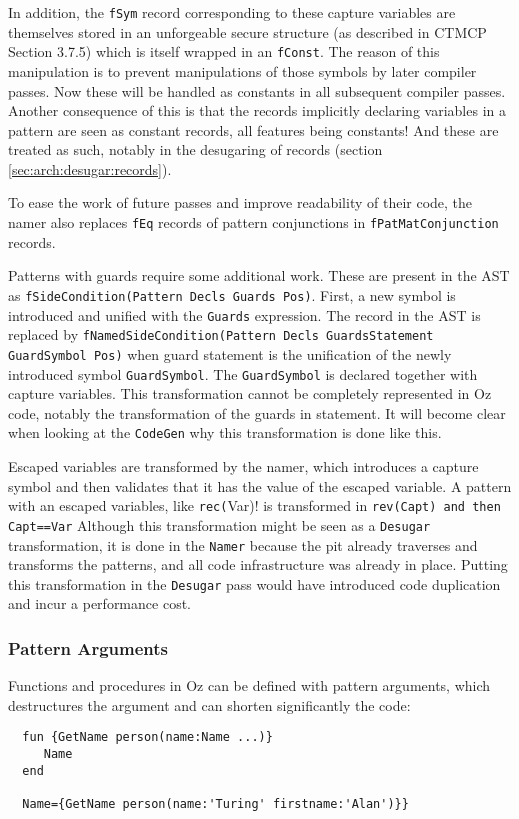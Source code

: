 \documentclass[a4paper]{memoir}
\begin{document}
In addition, the \lstinline!fSym! record corresponding to these capture
variables are themselves stored in an unforgeable secure structure (as
described in CTMCP Section 3.7.5) which is itself wrapped in an
\lstinline!fConst!. The reason of this manipulation is to prevent manipulations
of those symbols by later compiler passes. Now these will be handled as
constants in all subsequent compiler passes. Another consequence of this is
that the records implicitly declaring variables in a pattern are seen as
constant records, all features being constants! And these are treated as such,
notably in the desugaring of records (section \ref{sec:arch:desugar:records}).

To ease the work of future passes and improve readability of their code, the
namer also replaces \lstinline!fEq! records of pattern conjunctions in
\lstinline!fPatMatConjunction! records.

Patterns with guards require some additional work. These are present in the AST
as \lstinline!fSideCondition(Pattern Decls Guards Pos)!. First, a new symbol is
introduced and unified with the \lstinline!Guards! expression. The record in the
AST is replaced by \lstinline!fNamedSideCondition(Pattern Decls GuardsStatement GuardSymbol Pos)! when guard statement is the unification of the newly
introduced symbol \lstinline!GuardSymbol!. The \lstinline!GuardSymbol! is
declared together with capture variables. 
This transformation cannot be completely represented in Oz code, notably the
transformation of the guards in statement. It will become clear when looking at
the \lstinline!CodeGen! why this transformation is done like this.


Escaped variables are transformed by the namer, which introduces a capture
symbol and then validates that it has the value of the escaped variable.
 A pattern with an escaped variables, like \lstinline!rec(!Var)! is
transformed in \lstinline!rev(Capt) and then Capt==Var!
Although this transformation might be seen as a \lstinline!Desugar! transformation, it is
done in the \lstinline!Namer! because the pit already traverses and transforms the
patterns, and all code infrastructure was already in place. Putting this
transformation in the \lstinline!Desugar! pass would have introduced code duplication and
incur a performance cost.



\subsubsection{Pattern Arguments}
Functions and procedures in Oz can be defined with pattern arguments, which
destructures the argument and can shorten significantly the code:
\begin{lstlisting}
  fun {GetName person(name:Name ...)}
     Name
  end

  Name={GetName person(name:'Turing' firstname:'Alan')}}
\end{lstlisting}
\end{document}
